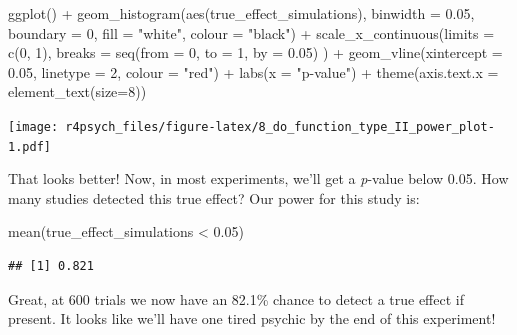 \documentclass[
]{book}
\newenvironment{Shaded}{\begin{snugshade}}{\end{snugshade}}
\newcommand{\AttributeTok}[1]{\textcolor[rgb]{0.77,0.63,0.00}{#1}}
\newcommand{\DecValTok}[1]{\textcolor[rgb]{0.00,0.00,0.81}{#1}}
\newcommand{\FloatTok}[1]{\textcolor[rgb]{0.00,0.00,0.81}{#1}}
\newcommand{\FunctionTok}[1]{\textcolor[rgb]{0.00,0.00,0.00}{#1}}
\newcommand{\NormalTok}[1]{#1}
\newcommand{\SpecialCharTok}[1]{\textcolor[rgb]{0.00,0.00,0.00}{#1}}
\newcommand{\StringTok}[1]{\textcolor[rgb]{0.31,0.60,0.02}{#1}}
\begin{document}
\begin{Shaded}
\begin{Highlighting}[]
\FunctionTok{ggplot}\NormalTok{() }\SpecialCharTok{+} 
  \FunctionTok{geom\_histogram}\NormalTok{(}\FunctionTok{aes}\NormalTok{(true\_effect\_simulations),}
                 \AttributeTok{binwidth =} \FloatTok{0.05}\NormalTok{,}
                 \AttributeTok{boundary =} \DecValTok{0}\NormalTok{,}
                 \AttributeTok{fill =} \StringTok{"white"}\NormalTok{,}
                 \AttributeTok{colour =} \StringTok{"black"}\NormalTok{) }\SpecialCharTok{+}
  \FunctionTok{scale\_x\_continuous}\NormalTok{(}\AttributeTok{limits =} \FunctionTok{c}\NormalTok{(}\DecValTok{0}\NormalTok{, }\DecValTok{1}\NormalTok{), }
                     \AttributeTok{breaks =} \FunctionTok{seq}\NormalTok{(}\AttributeTok{from =} \DecValTok{0}\NormalTok{, }\AttributeTok{to =} \DecValTok{1}\NormalTok{, }\AttributeTok{by =} \FloatTok{0.05}\NormalTok{)}
\NormalTok{                     ) }\SpecialCharTok{+}
  \FunctionTok{geom\_vline}\NormalTok{(}\AttributeTok{xintercept =} \FloatTok{0.05}\NormalTok{, }\AttributeTok{linetype =} \DecValTok{2}\NormalTok{, }\AttributeTok{colour =} \StringTok{"red"}\NormalTok{) }\SpecialCharTok{+}
  \FunctionTok{labs}\NormalTok{(}\AttributeTok{x =} \StringTok{"p{-}value"}\NormalTok{) }\SpecialCharTok{+}
  \FunctionTok{theme}\NormalTok{(}\AttributeTok{axis.text.x =} \FunctionTok{element\_text}\NormalTok{(}\AttributeTok{size=}\DecValTok{8}\NormalTok{))}
\end{Highlighting}
\end{Shaded}

\texttt{[image: r4psych\_files/figure-latex/8\_do\_function\_type\_II\_power\_plot-1.pdf]}

That looks better! Now, in most experiments, we'll get a \emph{p}-value below 0.05. How many studies detected this true effect? Our power for this study is:

\begin{Shaded}
\begin{Highlighting}[]
\FunctionTok{mean}\NormalTok{(true\_effect\_simulations }\SpecialCharTok{\textless{}} \FloatTok{0.05}\NormalTok{)}
\end{Highlighting}
\end{Shaded}

\begin{verbatim}
## [1] 0.821
\end{verbatim}

Great, at 600 trials we now have an 82.1\% chance to detect a true effect if present. It looks like we'll have one tired psychic by the end of this experiment!
\end{document}
